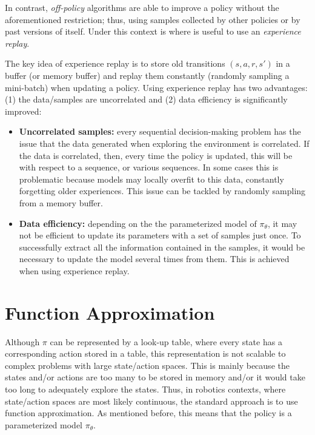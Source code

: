 In contrast, \emph{off-policy} algorithms are able to improve a policy without the aforementioned restriction; thus, using samples collected by other policies or by past versions of itself. Under this context is where is useful to use an \emph{experience replay}.

The key idea of experience replay is to store old transitions $(s, a, r, s')$ in a buffer (or memory buffer) and replay them constantly (randomly sampling a mini-batch) when updating a policy. Using experience replay has two advantages: (1) the data/samples are uncorrelated and (2) data efficiency is significantly improved:

\begin{itemize}
    \item \textbf{Uncorrelated samples:} every sequential decision-making problem has the issue that the data generated when exploring the environment is correlated. If the data is correlated, then, every time the policy is updated, this will be with respect to a sequence, or various sequences. In some cases this is problematic because models may locally overfit to this data, constantly forgetting older experiences. This issue can be tackled by randomly sampling from a memory buffer.
    
    \item\textbf{Data efficiency:} depending on the the parameterized model of $\pi_{\theta}$, it may not be efficient to update its parameters with a set of samples just once. To successfully extract all the information contained in the samples, it would be necessary to update the model several times from them. This is achieved when using experience replay.
\end{itemize}

\section{Function Approximation \cite{kober2013reinforcement, sutton2018reinforcement}}
Although $\pi$ can be represented by a look-up table, where every state has a corresponding action stored in a table, this representation is not scalable to complex problems with large state/action spaces. This is mainly because the states and/or actions are too many to be stored in memory and/or it would take too long to adequately explore the states. Thus, in robotics contexts, where state/action spaces are most likely continuous, the standard approach is to use function approximation. As mentioned before, this means that the policy is a parameterized model $\pi_{\theta}$.


